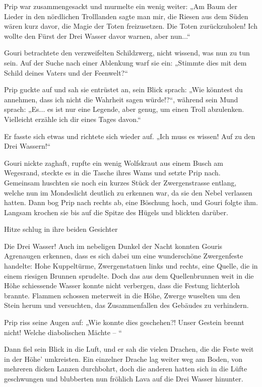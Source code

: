 Prip war zusammengesackt und murmelte ein wenig weiter: „Am Baum der Lieder in den nördlichen Trolllanden sagte man mir, die Riesen aus dem Süden wären kurz davor, die Magie der Toten freizusetzen. Die Toten zurückzuholen! Ich wollte den Fürst der Drei Wasser davor warnen, aber nun...“

Gouri betrachtete den verzweifelten Schildzwerg, nicht wissend, was nun zu tun sein. Auf der Suche nach einer Ablenkung warf sie ein: „Stimmte dies mit dem Schild deines Vaters und der Feenwelt?“

Prip guckte auf und sah sie entrüstet an, sein Blick sprach: „Wie könntest du annehmen, dass ich nicht die Wahrheit sagen würde!?“, während sein Mund sprach: „Es... es ist nur eine Legende, aber genug, um einen Troll abzulenken. Vielleicht erzähle ich dir eines Tages davon.“

Er fasste sich etwas und richtete sich wieder auf. „Ich muss es wissen! Auf zu den Drei Wassern!“

Gouri nickte zaghaft, rupfte ein wenig Wolfskraut aus einem Busch am Wegesrand, steckte es in die Tasche ihres Wams und setzte Prip nach. Gemeinsam huschten sie noch ein kurzes Stück der Zwergenstrasse entlang, welche nun im Mondeslicht deutlich zu erkennen war, da sie den Nebel verlassen hatten. Dann bog Prip nach rechts ab, eine Böschung hoch, und Gouri folgte ihm. Langsam krochen sie bis auf die Spitze des Hügels und blickten darüber.

Hitze schlug in ihre beiden Gesichter

Die Drei Wasser! Auch im nebeligen Dunkel der Nacht konnten Gouris Agrenaugen erkennen, dass es sich dabei um eine wunderschöne Zwergenfeste handelte: Hohe Kuppeltürme, Zwergenstatuen links und rechts, eine Quelle, die in einem riesigen Brunnen sprudelte. Doch das aus dem Quellenbrunnen weit in die Höhe schiessende Wasser konnte nicht verbergen, dass die Festung lichterloh brannte. Flammen schossen meterweit in die Höhe, Zwerge wuselten um den Stein herum und versuchten, das Zusammenfallen des Gebäudes zu verhindern.

Prip riss seine Augen auf: „Wie konnte dies geschehen?! Unser Gestein brennt nicht! Welche diabolischen Mächte – “

Dann fiel sein Blick in die Luft, und er sah die vielen Drachen, die die Feste weit in der Höhe’ umkreisten. Ein einzelner Drache lag weiter weg am Boden, von mehreren dicken Lanzen durchbohrt, doch die anderen hatten sich in die Lüfte geschwungen und blubberten nun fröhlich Lava auf die Drei Wasser hinunter.

